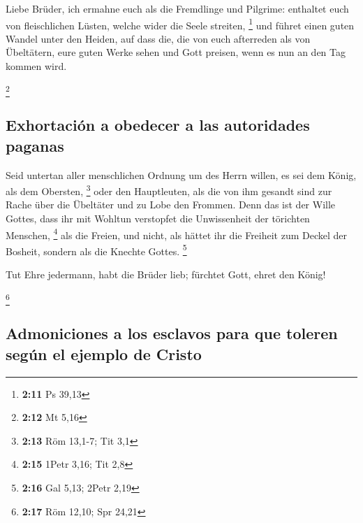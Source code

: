  Liebe Brüder, ich ermahne euch als die Fremdlinge und
Pilgrime: enthaltet euch von fleischlichen Lüsten, welche wider die
Seele streiten, \footnote{\textbf{2:11} Ps 39,13}  und
führet einen guten Wandel unter den Heiden, auf dass die, die von euch
afterreden als von Übeltätern, eure guten Werke sehen und Gott preisen,
wenn es nun an den Tag kommen wird.

\footnote{\textbf{2:12} Mt 5,16}

\hypertarget{exhortaciuxf3n-a-obedecer-a-las-autoridades-paganas}{%
\subsection{Exhortación a obedecer a las autoridades
paganas}\label{exhortaciuxf3n-a-obedecer-a-las-autoridades-paganas}}

 Seid untertan aller menschlichen Ordnung um des Herrn
willen, es sei dem König, als dem Obersten, \footnote{\textbf{2:13} Röm
  13,1-7; Tit 3,1}  oder den Hauptleuten, als die von ihm
gesandt sind zur Rache über die Übeltäter und zu Lobe den Frommen.
 Denn das ist der Wille Gottes, dass ihr mit Wohltun
verstopfet die Unwissenheit der törichten Menschen, \footnote{\textbf{2:15}
  1Petr 3,16; Tit 2,8}  als die Freien, und nicht, als
hättet ihr die Freiheit zum Deckel der Bosheit, sondern als die Knechte
Gottes. \footnote{\textbf{2:16} Gal 5,13; 2Petr 2,19}

 Tut Ehre jedermann, habt die Brüder lieb; fürchtet Gott,
ehret den König!

\footnote{\textbf{2:17} Röm 12,10; Spr 24,21}

\hypertarget{admoniciones-a-los-esclavos-para-que-toleren-seguxfan-el-ejemplo-de-cristo}{%
\subsection{Admoniciones a los esclavos para que toleren según el
ejemplo de
Cristo}\label{admoniciones-a-los-esclavos-para-que-toleren-seguxfan-el-ejemplo-de-cristo}}

